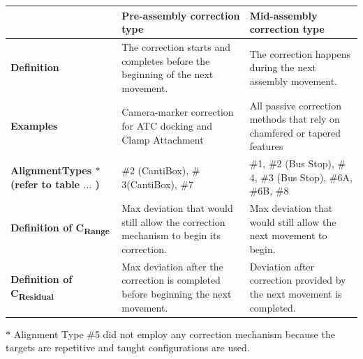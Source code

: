\documentclass[11pt]{book}
\begin{document}
\begin{table}[H]
\begin{adjustbox}{max width=\textwidth}
\begin{tabular}{p{4.18cm}p{5.85cm}p{5.85cm}}
\hline
\multicolumn{1}{|p{4.18cm}}{} & 
\multicolumn{1}{|p{5.85cm}}{{\footnotesize \textbf{Pre-assembly correction type}}} & 
\multicolumn{1}{|p{5.85cm}|}{{\footnotesize \textbf{Mid-assembly correction type}}} \\ 
\hline
\multicolumn{1}{|p{4.18cm}}{{\footnotesize \textbf{Definition}}} & 
\multicolumn{1}{|p{5.85cm}}{{\footnotesize The correction starts and completes before the beginning of the next movement. }} & 
\multicolumn{1}{|p{5.85cm}|}{{\footnotesize The correction happens during the next assembly movement. } \newline
} \\ 
\hline
\multicolumn{1}{|p{4.18cm}}{{\footnotesize \textbf{Examples}}} & 
\multicolumn{1}{|p{5.85cm}}{{\footnotesize Camera-marker correction for ATC docking and Clamp Attachment}} & 
\multicolumn{1}{|p{5.85cm}|}{{\footnotesize All passive correction methods that rely on chamfered or tapered features}} \\ 
\hline
\multicolumn{1}{|p{4.18cm}}{{\footnotesize \textbf{AlignmentTypes $\ast$ (refer to table $\ldots$ )}}} & 
\multicolumn{1}{|p{5.85cm}}{{\footnotesize $\#$2 (CantiBox), $\#$3(CantiBox), $\#$7}} & 
\multicolumn{1}{|p{5.85cm}|}{{\footnotesize $\#$1, $\#$2 (Bus Stop), $\#$4, $\#$3 (Bus Stop), $\#$6A, $\#$6B, $\#$8}} \\ 
\hline
\multicolumn{1}{|p{4.18cm}}{{\footnotesize \textbf{Definition of C\textsubscript{Range}}}} & 
\multicolumn{1}{|p{5.85cm}}{{\footnotesize Max deviation that would still allow the correction mechanism to begin its correction.}} & 
\multicolumn{1}{|p{5.85cm}|}{{\footnotesize Max deviation that would still allow the next movement to begin.}} \\ 
\hline
\multicolumn{1}{|p{4.18cm}}{{\footnotesize \textbf{Definition of C\textsubscript{Residual }}}} & 
\multicolumn{1}{|p{5.85cm}}{{\footnotesize Max deviation after the correction is completed before beginning the next movement.}} & 
\multicolumn{1}{|p{5.85cm}|}{{\footnotesize Deviation after correction provided by the next movement is completed.}} \\ 
\hline
\end{tabular}
\end{adjustbox}
\end{table}
\vspace{2\baselineskip}
{\footnotesize $\ast$ Alignment Type $\#$5 did not employ any correction mechanism because the targets are repetitive and taught configurations are used.\par}
\end{document}
